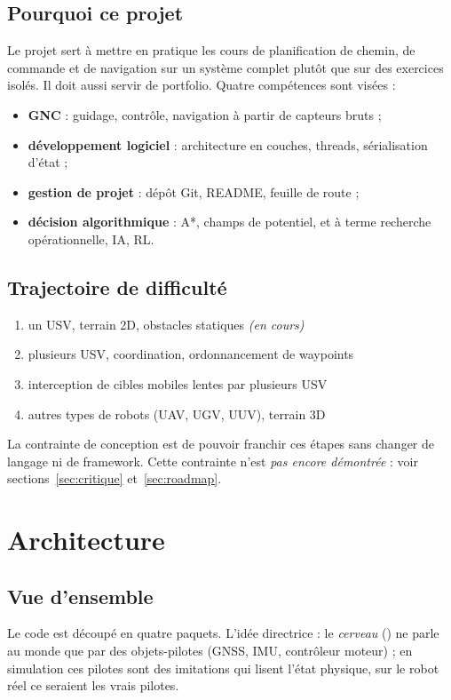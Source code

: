 \documentclass[11pt,a4paper]{article}
\newcommand{\code}[1]{\texttt{\detokenize{#1}}}
\begin{document}
\subsection{Pourquoi ce projet}
Le projet sert à mettre en pratique les cours de planification de chemin, de commande et de navigation
sur un système complet plutôt que sur des exercices isolés. Il doit aussi servir de portfolio. Quatre
compétences sont visées :
\begin{itemize}
\item \textbf{GNC} : guidage, contrôle, navigation à partir de capteurs bruts ;
\item \textbf{développement logiciel} : architecture en couches, threads, sérialisation d'état ;
\item \textbf{gestion de projet} : dépôt Git, README, feuille de route ;
\item \textbf{décision algorithmique} : A*, champs de potentiel, et à terme recherche opérationnelle, IA, RL.
\end{itemize}

\subsection{Trajectoire de difficulté}
\begin{enumerate}
\item un USV, terrain 2D, obstacles statiques \hfill\textit{(en cours)}
\item plusieurs USV, coordination, ordonnancement de waypoints
\item interception de cibles mobiles lentes par plusieurs USV
\item autres types de robots (UAV, UGV, UUV), terrain 3D
\end{enumerate}
La contrainte de conception est de pouvoir franchir ces étapes sans changer de langage ni de framework.
Cette contrainte n'est \emph{pas encore démontrée} : voir sections~\ref{sec:critique} et~\ref{sec:roadmap}.

\section{Architecture}
\label{sec:archi}
\subsection{Vue d'ensemble}
Le code est découpé en quatre paquets. L'idée directrice : le \emph{cerveau} (\code{autonomy}) ne parle
au monde que par des objets-pilotes (GNSS, IMU, contrôleur moteur) ; en simulation ces pilotes sont des
imitations qui lisent l'état physique, sur le robot réel ce seraient les vrais pilotes.
\end{document}
